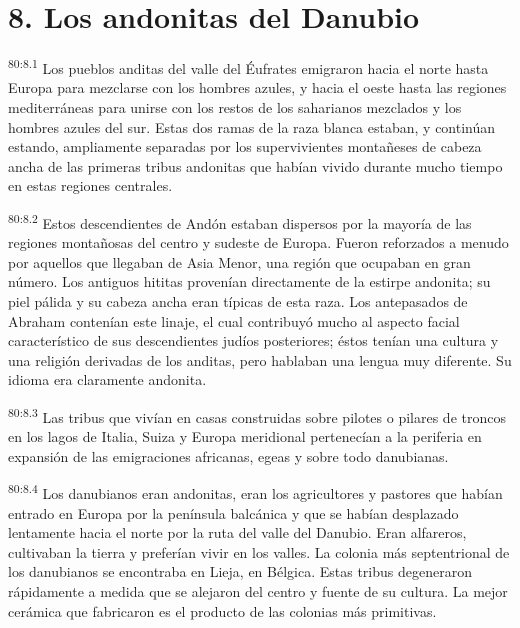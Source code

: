 \section*{8. Los andonitas del Danubio}
\par
\textsuperscript{80:8.1} Los pueblos anditas del valle del Éufrates emigraron hacia el norte hasta Europa para mezclarse con los hombres azules, y hacia el oeste hasta las regiones mediterráneas para unirse con los restos de los saharianos mezclados y los hombres azules del sur. Estas dos ramas de la raza blanca estaban, y continúan estando, ampliamente separadas por los supervivientes montañeses de cabeza ancha de las primeras tribus andonitas que habían vivido durante mucho tiempo en estas regiones centrales.

\par
\textsuperscript{80:8.2} Estos descendientes de Andón estaban dispersos por la mayoría de las regiones montañosas del centro y sudeste de Europa. Fueron reforzados a menudo por aquellos que llegaban de Asia Menor, una región que ocupaban en gran número. Los antiguos hititas provenían directamente de la estirpe andonita; su piel pálida y su cabeza ancha eran típicas de esta raza. Los antepasados de Abraham contenían este linaje, el cual contribuyó mucho al aspecto facial característico de sus descendientes judíos posteriores; éstos tenían una cultura y una religión derivadas de los anditas, pero hablaban una lengua muy diferente. Su idioma era claramente andonita.

\par
\textsuperscript{80:8.3} Las tribus que vivían en casas construidas sobre pilotes o pilares de troncos en los lagos de Italia, Suiza y Europa meridional pertenecían a la periferia en expansión de las emigraciones africanas, egeas y sobre todo danubianas.

\par
\textsuperscript{80:8.4} Los danubianos eran andonitas, eran los agricultores y pastores que habían entrado en Europa por la península balcánica y que se habían desplazado lentamente hacia el norte por la ruta del valle del Danubio. Eran alfareros, cultivaban la tierra y preferían vivir en los valles. La colonia más septentrional de los danubianos se encontraba en Lieja, en Bélgica. Estas tribus degeneraron rápidamente a medida que se alejaron del centro y fuente de su cultura. La mejor cerámica que fabricaron es el producto de las colonias más primitivas.

